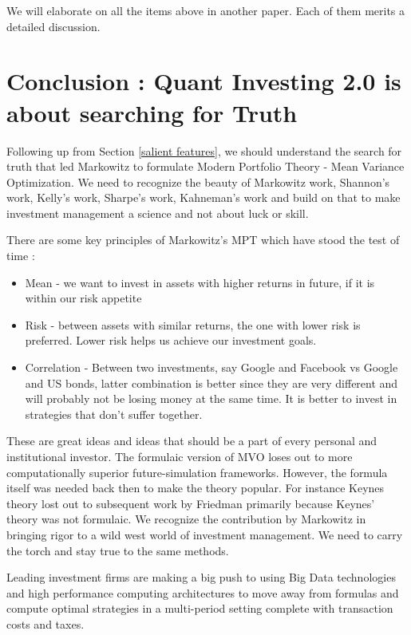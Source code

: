 \documentclass[a4paper]{article}
\begin{document}
We will elaborate on all the items above in another paper. Each of them merits a detailed discussion.

\section{Conclusion : Quant Investing 2.0 is about searching for Truth}
Following up from Section \ref{salient features}, we should understand the search for truth that led Markowitz to formulate Modern Portfolio Theory - Mean Variance Optimization. We need to recognize the beauty of Markowitz work\cite{hm90}, Shannon's work, Kelly's work\cite{Kelly90}, Sharpe's work\cite{Shp90}, Kahneman's work\cite{dk2002} and build on that to make investment management a science and not about luck or skill.

There are some key principles of Markowitz’s MPT which have stood the test of time :
\begin{itemize}
\item Mean - we want to invest in assets with higher returns in future, if it is within our risk appetite
\item Risk - between assets with similar returns, the one with lower risk is preferred. Lower risk helps us achieve our investment goals.
\item Correlation - Between two investments, say Google and Facebook vs Google and US bonds, latter combination is better since they are very different and will probably not be losing money at the same time. It is better to invest in strategies that don't suffer together.
\end{itemize}

These are great ideas and ideas that should be a part of every personal and institutional investor. The formulaic version of MVO loses out to more computationally superior future-simulation frameworks. However, the formula itself was needed back then to make the theory popular. For instance Keynes theory lost out to subsequent work by Friedman primarily because Keynes’ theory was not formulaic. We recognize the contribution by Markowitz in bringing rigor to a wild west world of investment management. We need to carry the torch and stay true to the same methods. 

Leading investment firms are making a big push to using Big Data technologies and high performance computing architectures to move away from formulas and compute optimal strategies in a multi-period setting complete with transaction costs and taxes. 
\end{document}
